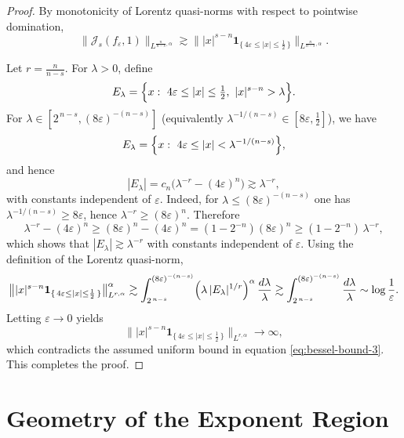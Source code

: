 \documentclass[12pt]{article}
\theoremstyle{definition}
\theoremstyle{remark}
\numberwithin{equation}{section}
\begin{document}
\begin{proof}
By monotonicity of Lorentz quasi-norms with respect to pointwise domination,
\[
\|\mathcal J_s(f_\varepsilon,1)\|_{L^{\frac{n}{n-s},\alpha}}
\gtrsim
\bigl\||x|^{s-n}\mathbf 1_{\{\,4\varepsilon\le |x|\le \frac12\,\}}\bigr\|_
{L^{\frac{n}{n-s},\alpha}}.
\]

Let $r=\frac{n}{n-s}$. For $\lambda>0$, define
\[
E_\lambda
=
\Bigl\{x:\ 4\varepsilon\le |x|\le \tfrac12,\ |x|^{s-n}>\lambda\Bigr\}.
\]
For $\lambda\in[2^{\,n-s},(8\varepsilon)^{-(n-s)}]$
(equivalently $\lambda^{-1/(n-s)}\in[8\varepsilon,\tfrac12]$),
we have
\[
E_\lambda
=
\Bigl\{x:\ 4\varepsilon\le |x|<\lambda^{-1/(n-s)}\Bigr\},
\]
and hence
\[
|E_\lambda|
=
c_n\bigl(\lambda^{-r}-(4\varepsilon)^n\bigr)
\gtrsim \lambda^{-r},
\]
with constants independent of $\varepsilon$.
Indeed, for $\lambda \le (8\varepsilon)^{-(n-s)}$ one has
$\lambda^{-1/(n-s)} \ge 8\varepsilon$, hence $\lambda^{-r} \ge (8\varepsilon)^n$.
Therefore
\[
\lambda^{-r}-(4\varepsilon)^n
\ge (8\varepsilon)^n-(4\varepsilon)^n
=(1-2^{-n})(8\varepsilon)^n
\ge (1-2^{-n})\,\lambda^{-r},
\]
which shows that $|E_\lambda|\gtrsim \lambda^{-r}$ with constants independent of
$\varepsilon$.
Using the definition of the Lorentz quasi-norm,
\[
\bigl\||x|^{s-n}\mathbf 1_{\{\,4\varepsilon\le |x|\le \frac12\,\}}\bigr\|_
{L^{r,\alpha}}^{\alpha}
\gtrsim
\int_{2^{\,n-s}}^{(8\varepsilon)^{-(n-s)}}
\Bigl(\lambda\,|E_\lambda|^{1/r}\Bigr)^{\alpha}\,\frac{d\lambda}{\lambda}
\gtrsim
\int_{2^{\,n-s}}^{(8\varepsilon)^{-(n-s)}} \frac{d\lambda}{\lambda}
\sim \log\frac1\varepsilon.
\]
Letting $\varepsilon\to0$ yields
\[
\bigl\||x|^{s-n}\mathbf 1_{\{\,4\varepsilon\le |x|\le \frac12\,\}}\bigr\|_
{L^{r,\alpha}}
\longrightarrow \infty,
\]
which contradicts the assumed uniform bound in equation \eqref{eq:bessel-bound-3}. This completes
the proof.
 \end{proof}

\section{Geometry of the Exponent Region}
\end{document}

